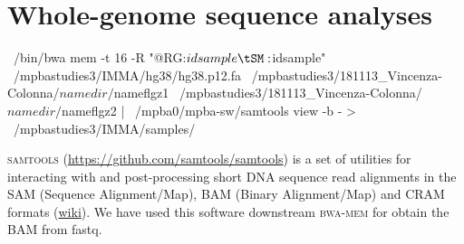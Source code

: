 \section {Whole-genome sequence analyses}




~/bin/bwa mem -t 16 -R "@RG\tID:$idsample\tSM:$idsample" \
/mpbastudies3/IMMA/hg38/hg38.p12.fa \ 
/mpbastudies3/181113_Vincenza-Colonna/$namedir/$nameflgz1 \ 
/mpbastudies3/181113_Vincenza-Colonna/$namedir/$nameflgz2 | \ 
/mpba0/mpba-sw/samtools view -b - > \
/mpbastudies3/IMMA/samples/%
  


\textsc{samtools} (\url{https://github.com/samtools/samtools}) is a set of utilities for interacting with and post-processing short DNA sequence read alignments in the SAM (Sequence Alignment/Map), BAM (Binary Alignment/Map) and CRAM formats (\href{https://en.wikipedia.org/wiki/SAMtools}{wiki}). \newline
We have used this software downstream \textsc{bwa-mem} for obtain the BAM from fastq. \newline

